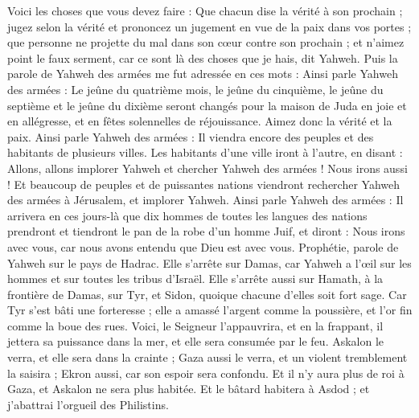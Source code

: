 \begin{multicols}{2}
Voici les choses que vous devez faire : Que chacun dise la vérité à son prochain ; jugez selon la vérité et prononcez un jugement en vue de la paix dans vos portes ;
que personne ne projette du mal dans son cœur contre son prochain ; et n'aimez point le faux serment, car ce sont là des choses que je hais, dit Yahweh.
Puis la parole de Yahweh des armées me fut adressée en ces mots :
Ainsi parle Yahweh des armées : Le jeûne du quatrième mois, le jeûne du cinquième, le jeûne du septième et le jeûne du dixième seront changés pour la maison de Juda en joie et en allégresse, et en fêtes solennelles de réjouissance. Aimez donc la vérité et la paix.
Ainsi parle Yahweh des armées : Il viendra encore des peuples et des habitants de plusieurs villes.
Les habitants d'une ville iront à l'autre, en disant : Allons, allons implorer Yahweh et chercher Yahweh des armées ! Nous irons aussi !
Et beaucoup de peuples et de puissantes nations viendront rechercher Yahweh des armées à Jérusalem, et implorer Yahweh.
Ainsi parle Yahweh des armées : Il arrivera en ces jours-là que dix hommes de toutes les langues des nations prendront et tiendront le pan de la robe d'un homme Juif, et diront : Nous irons avec vous, car nous avons entendu que Dieu est avec vous.
\VerseOne{}Prophétie, parole de Yahweh sur le pays de Hadrac. Elle s'arrête sur Damas, car Yahweh a l'œil sur les hommes et sur toutes les tribus d'Israël.
Elle s'arrête aussi sur Hamath, à la frontière de Damas, sur Tyr, et Sidon, quoique chacune d'elles soit fort sage.
Car Tyr s'est bâti une forteresse ; elle a amassé l'argent comme la poussière, et l'or fin comme la boue des rues.
Voici, le Seigneur l'appauvrira, et en la frappant, il jettera sa puissance dans la mer, et elle sera consumée par le feu.
Askalon le verra, et elle sera dans la crainte ; Gaza aussi le verra, et un violent tremblement la saisira ; Ekron aussi, car son espoir sera confondu. Et il n'y aura plus de roi à Gaza, et Askalon ne sera plus habitée.
Et le bâtard habitera à Asdod ; et j'abattrai l'orgueil des Philistins.

\end{multicols}
